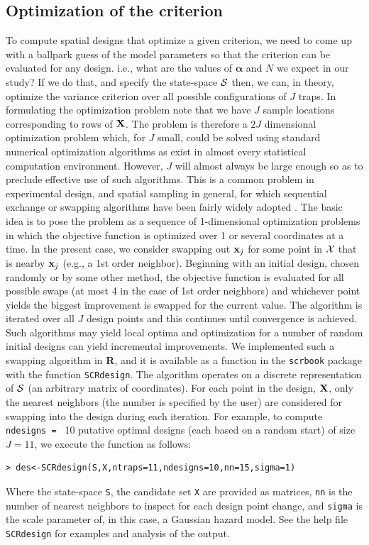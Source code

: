 \subsection{Optimization of the criterion}
\label{design.sec.exchange}


To compute spatial designs that optimize a given criterion, we need to
come up with a ballpark guess of the model parameters so that the
criterion can be evaluated for any design. i.e., what are the values of
${\bm \alpha}$ and $N$ we expect in our study?  If we do that, and
specify the state-space ${\cal S}$ then, we can, in theory, optimize
the variance criterion over all possible configurations of $J$ traps.
In formulating the optimization problem note that we have $J$ sample
locations corresponding to rows of ${\bf X}$.  The problem is
therefore a $2J$ dimensional optimization problem which, for $J$
small, could be solved using standard numerical optimization
algorithms as exist in almost every statistical computation
environment.  However, $J$ will almost always be large enough so as to
preclude effective use of such algorithms. This is a common problem in
experimental design, and spatial sampling in general, for which
sequential exchange or swapping algorithms have been fairly widely
adopted \citep[e.g.,][]{wynn:1970, fedorov:1972, mitchell:1974,
  meyer_nachtsheim:1995,nychka_etal:1997,royle_nychka:1998}.  The
basic idea is to pose the problem as a sequence of 1-dimensional
optimization problems in which the objective function is optimized
over 1 or several coordinates at a time.  In the present case, we
consider swapping out ${\bf x}_{j}$ for some point in ${\cal X}$ that
is nearby ${\bf x}_{j}$ (e.g., a 1st order neighbor). Beginning with
an initial design, chosen randomly or by some other method, the
objective function is evaluated for all possible swaps (at most 4 in
the case of 1st order neighbors) and whichever point yields the
biggest improvement is swapped for the current value.  The algorithm
is iterated over all $J$ design points and this continues until
convergence is achieved. Such algorithms may yield local optima and
optimization for a number of random initial designs can yield
incremental improvements. We implemented such a swapping algorithm in
{\bf R}, and it is available as a function in the \mbox{\tt scrbook}
package with the function \mbox{\tt SCRdesign}.  The algorithm
operates on a discrete representation of ${\cal S}$ (an arbitrary
matrix of coordinates).  For each point in the design, ${\bf X}$, only
the nearest neighbors (the number is specified by the user) are
considered for swapping into the design during each iteration.  For
example, to compute \mbox{\tt ndesigns = } 10 putative optimal designs
(each based on a random start) of size $J=11$, we execute the function
as follows:
\begin{verbatim}
> des<-SCRdesign(S,X,ntraps=11,ndesigns=10,nn=15,sigma=1)
\end{verbatim}
Where the state-space \mbox{\tt S}, the candidate set \mbox{\tt X} are
provided as matrices, \mbox{\tt nn} is the number of nearest neighbors
to inspect for each design point change, and \mbox{\tt sigma} is the scale
parameter of, in this case, a Gaussian hazard model. See the help file
\mbox{\tt SCRdesign} for examples and analysis of the output. 


